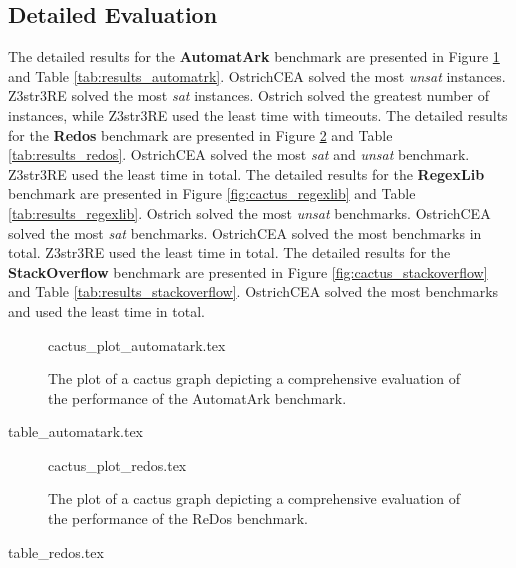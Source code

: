\documentclass{standalone}
\begin{document}
\subsection{Detailed Evaluation}
The detailed results for the \textbf{AutomatArk} benchmark are presented in Figure \ref{fig:cactus_automatrk} and Table \ref{tab:results_automatrk}. OstrichCEA solved the most \emph{unsat} instances. Z3str3RE solved the most \emph{sat} instances. Ostrich solved the greatest number of instances, while Z3str3RE used the least time with timeouts.\newline
The detailed results for the \textbf{Redos} benchmark are presented in Figure \ref{fig:cactus_redos} and Table \ref{tab:results_redos}. OstrichCEA solved the most \emph{sat} and \emph{unsat} benchmark. Z3str3RE used the least time in total. \newline 
The detailed results for the \textbf{RegexLib} benchmark are presented in Figure \ref{fig:cactus_regexlib} and Table \ref{tab:results_regexlib}. Ostrich solved the most \emph{unsat} benchmarks. OstrichCEA solved the most \emph{sat} benchmarks. OstrichCEA solved the most benchmarks in total.  Z3str3RE used the least time in total. \newline
The detailed results for the \textbf{StackOverflow} benchmark are presented in Figure \ref{fig:cactus_stackoverflow} and Table \ref{tab:results_stackoverflow}. OstrichCEA solved the most benchmarks and used the least time in total.\newline
\begin{figure}
  \centering
  {cactus_plot_automatark.tex}
  \caption{The plot of a cactus graph depicting a comprehensive evaluation of the performance of the AutomatArk benchmark.}
  \label{fig:cactus_automatrk}
\end{figure}
\begin{table}
  {table_automatark.tex}
  \caption{Detailed results for the AutomatArk benchmark.}
  \label{tab:results_automatrk}
\end{table}

\begin{figure}
  {cactus_plot_redos.tex}
  \caption{The plot of a cactus graph depicting a comprehensive evaluation of the performance of the ReDos benchmark.}
  \label{fig:cactus_redos}
\end{figure}
\begin{table}
  {table_redos.tex}
  \caption{Detailed results for the ReDos benchmark.}
  \label{tab:results_redos}
\end{table}
\end{document}
